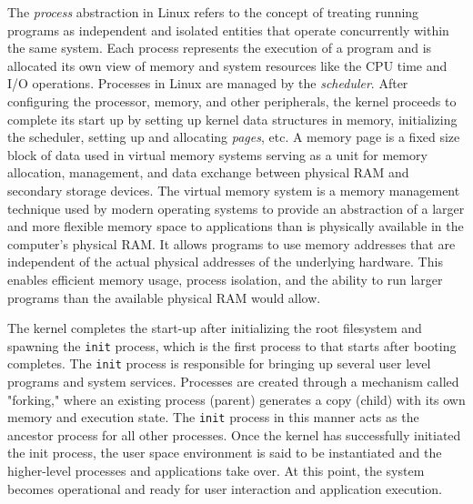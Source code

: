 The \textit{process} abstraction in Linux refers to the concept of treating running programs as independent and isolated entities that operate concurrently within the same system. Each process represents the execution of a program and is allocated its own view of memory and system resources like the CPU time and I/O operations. Processes in Linux are managed by the \textit{scheduler}. After configuring the processor, memory, and other peripherals, the kernel proceeds to complete its start up by setting up kernel data structures in memory, initializing the scheduler, setting up and allocating \textit{pages}, etc. A memory page is a fixed size block of data used in virtual memory systems serving as a unit for memory allocation, management, and data exchange between physical RAM and secondary storage devices. The virtual memory system is a memory management technique used by modern operating systems to provide an abstraction of a larger and more flexible memory space to applications than is physically available in the computer's physical RAM. It allows programs to use memory addresses that are independent of the actual physical addresses of the underlying hardware. This enables efficient memory usage, process isolation, and the ability to run larger programs than the available physical RAM would allow.

\begin{figure}[h]
	\centering
\end{figure}

The kernel completes the start-up after initializing the root filesystem and spawning the \texttt{init} process, which is the first process to that starts after booting completes. The \texttt{init} process is responsible for bringing up several user level programs and system services. Processes are created through a mechanism called "forking," where an existing process (parent) generates a copy (child) with its own memory and execution state. The \texttt{init} process in this manner acts as the ancestor process for all other processes. Once the kernel has successfully initiated the init process, the user space environment is said to be instantiated and the higher-level processes and applications take over. At this point, the system becomes operational and ready for user interaction and application execution.
